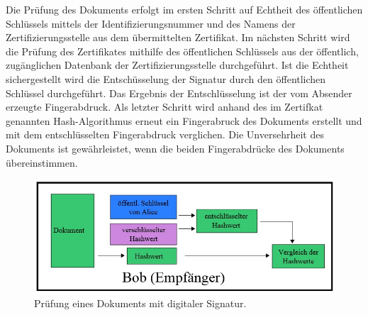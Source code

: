 Die Prüfung des Dokuments erfolgt im ersten Schritt auf Echtheit des öffentlichen Schlüssels mittels der Identifizierungsnummer und des Namens der Zertifizierungsstelle aus dem übermittelten Zertifikat. Im nächsten Schritt wird die Prüfung des Zertifikates mithilfe des öffentlichen Schlüssels aus der öffentlich, zugänglichen Datenbank der Zertifizierungsstelle durchgeführt. Ist die Echtheit sichergestellt wird die Entschüsselung der Signatur durch den öffentlichen Schlüssel durchgeführt. Das Ergebnis der Entschlüsselung ist der vom Absender erzeugte Fingerabdruck. Als letzter Schritt wird anhand des im Zertifkat genannten Hash-Algorithmus erneut ein Fingerabruck des Dokuments erstellt und mit dem entschlüsselten Fingerabdruck verglichen. Die Unversehrheit des Dokuments ist gewährleistet, wenn die beiden Fingerabdrücke des Dokuments übereinstimmen. \cite{techno1}
\begin{figure}[!ht]
    \centering
    \includegraphics[width=\textwidth]{PruefungEmpfaenger2.jpg}
    \caption[Prüfung eines Dokuments mit digitaler Signatur]{\small{Prüfung eines Dokuments mit digitaler Signatur. \cite{techno3}}}
    \label{fig:3}
\end{figure}